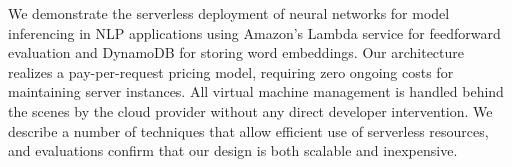 We demonstrate the serverless deployment of neural networks for model inferencing in NLP applications using Amazon's Lambda service for feedforward evaluation and DynamoDB for storing word embeddings. Our architecture realizes a pay-per-request pricing model, requiring zero ongoing costs for maintaining server instances. All virtual machine management is handled behind the scenes by the cloud provider without any direct developer intervention. We describe a number of techniques that allow efficient use of serverless resources, and evaluations confirm that our design is both scalable and inexpensive.

